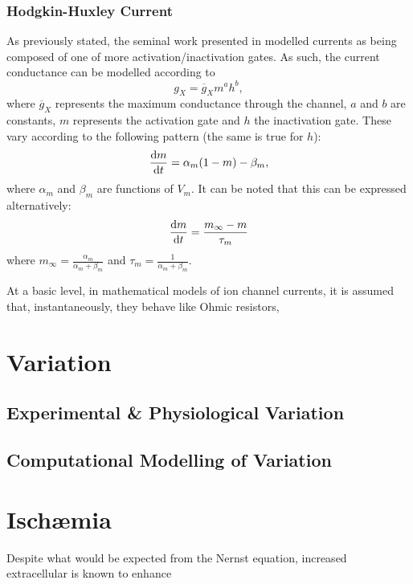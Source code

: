 \documentclass[../thesis-main.tex]{subfiles}
\begin{document}
 \subsubsection{Hodgkin-Huxley Current}
 As previously stated, the seminal work presented in \citet{Hodgkin1952} modelled currents as being composed of one of more activation/inactivation gates. As such, the current conductance can be modelled according to
 \begin{equation}
  g_X = \overline{g}_Xm^a h^b,
 \end{equation}
 where $\overline{g}_X$ represents the maximum conductance through the channel, $a$ and $b$ are constants, $m$ represents the activation gate and $h$ the inactivation gate. These vary according to the following pattern (the same is true for $h$):
 \begin{equation}
  \frac{\textnormal{d}m}{\textnormal{d}t} = \alpha_m(1-m)-\beta_m,
 \end{equation}
 where $\alpha_m$ and $\beta_m$ are functions of $V_m$. It can be noted that this can be expressed alternatively:
 \begin{equation}
  \frac{\textnormal{d}m}{\textnormal{d}t} = \frac{m_\infty-m}{\tau_m}
 \end{equation}
 where $m_\infty=\frac{\alpha_m}{\alpha_m+\beta_m}$ and $\tau_m=\frac{1}{\alpha_m+\beta_m}$.
 
 At a basic level, in mathematical models of ion channel currents, it is assumed that, instantaneously, they behave like Ohmic resistors, \idest
 
 \section{Variation}
 \label{sec:param-var}
 
 \subsection{Experimental \& Physiological Variation}
 \label{subsec:experimental-var}
 
 \subsection{Computational Modelling of Variation}
 \label{subsec:comp-var}
 
 \section{Isch\ae mia}
 \label{sec:ischaemia}
 Despite what would be expected from the Nernst equation, increased extracellular \K{} is known to enhance \ikr{} \citep{Sanguinetti1992, Yang1997}
 
\end{document}
